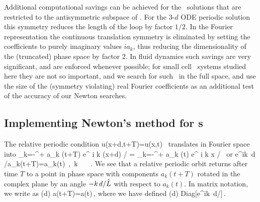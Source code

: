 Additional computational savings can be achieved
for the \KS\ solutions that are restricted
to the antisymmetric subspace of .
For the 3-$d$ ODE periodic solution this symmetry reduces
the length of the loop by factor $1/2$. In the Fourier representation
the continuous translation symmetry is eliminated by
setting  the coefficients to purely imaginary values $i a_k$,
thus reducing the dimensionality of the (truncated) phase space
by factor 2. In fluid dynamics such savings are very significant, 
and are enforced whenever possible; for small cell \KS\ systems
studied here they are not so important, and we search for such
\eqva\ in the full space, and use the size of the (symmetry violating)
real Fourier coefficients as an
additional test of the accuracy of our Newton searches.
  


\subsection{Implementing Newton's method  for \rpo s}
\label{sec:NewtRPOs}

The relative periodic condition
\beq
	u(x+d,t+T)=u(x,t) \,
\eeq
translates in Fourier space into
\beq	
	\sum_{k=-\infty}^{+\infty} a_k (t+T) e^{ i k (x+d) / \tildeL} 
		= \sum_{k=-\infty}^{+\infty} a_k (t) e^{ i k x / \tildeL} \,
\eeq
or
\beq
	e^{ik\, d /\tildeL}a_k(t+T)=a_k(t) \,,\ \forall k \in {}\ \ \ .
	\label{eq:RPOcondition}
\eeq
We see that a relative periodic orbit returns after time $T$ to a point in 
phase space with components $a_k(t+T)$ rotated in the complex plane by an 
angle $-k\, d /\tilde{L}$ with respect to $a_k(t)$. In matrix notation, we write  as
\beq
	(d)  a(t+T)=a(t)\,,
	\label{eq:RPO}
\eeq
where we have defined
\beq
	(d) \equiv \mbox{Diag}[e^{ik\, d/\tildeL}]\,.
\eeq

